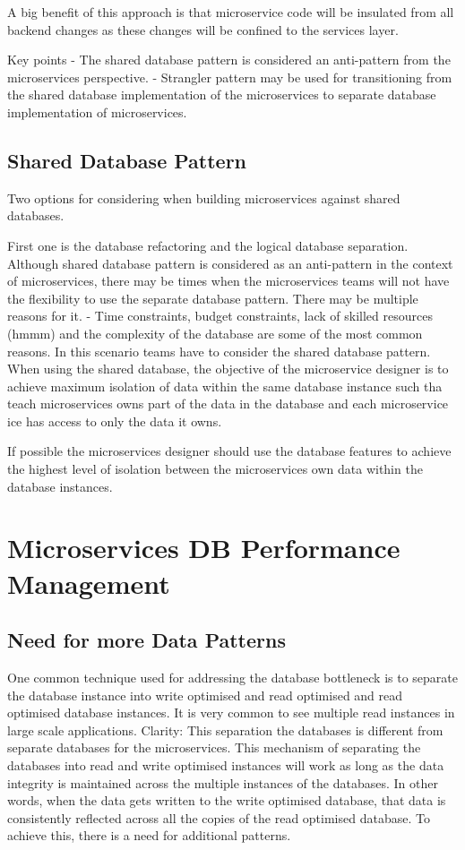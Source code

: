 \documentclass[a4paper, 11pt]{book}
\begin{document}
    A big benefit of this approach is that microservice code will be insulated from all backend changes as these changes will be confined to the services layer.

    Key points
    - The shared database pattern is considered an anti-pattern from the microservices perspective.
    - Strangler pattern may be used for transitioning from the shared database implementation of the microservices to separate database implementation of microservices.


    \section{Shared Database Pattern}
    Two options for considering when building microservices against shared databases.

    First one is the database refactoring and the logical database separation.
    Although shared database pattern is considered as an anti-pattern in the context of microservices, there may be times when the microservices teams will not have the flexibility to use the separate database pattern.
    There may be multiple reasons for it.
    - Time constraints, budget constraints, lack of skilled resources (hmmm) and the complexity of the database are some of the most common reasons.
    In this scenario teams have to consider the shared database pattern.
    When using the shared database, the objective of the microservice designer is to achieve maximum isolation of data within the same database instance such tha teach microservices owns part of the data in the database and each microservice ice has access to only the data it owns.

    If possible the microservices designer should use the database features to achieve the highest level of isolation between the microservices own data within the database instances.


    \chapter{Microservices DB Performance Management}


    \section{Need for more Data Patterns}
    One common technique used for addressing the database bottleneck is to separate the database instance into write optimised and read optimised and read optimised database instances.
    It is very common to see multiple read instances in large scale applications.
    Clarity: This separation the databases is different from separate databases for the microservices.
    This mechanism of separating the databases into read and write optimised instances will work as long as the data integrity is maintained across the multiple instances of the databases.
    In other words, when the data gets written to the write optimised database, that data is consistently reflected across all the copies of the read optimised database.
    To achieve this, there is a need for additional patterns.
\end{document}
